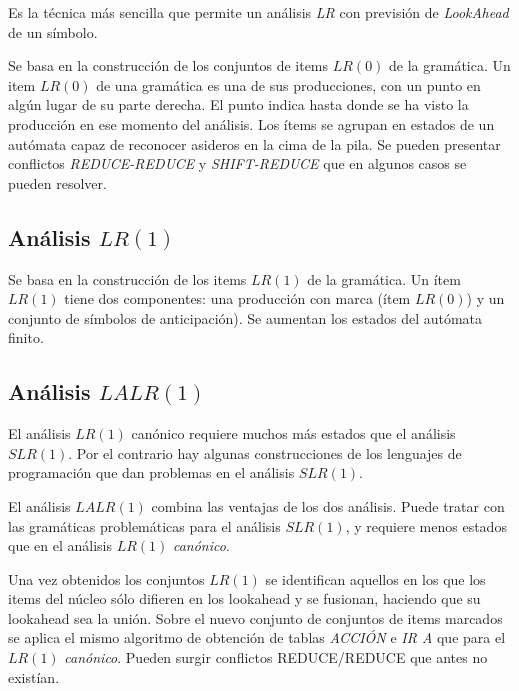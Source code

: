 Es la técnica más sencilla que permite un análisis \textit{LR} con previsión de \textit{LookAhead} de un símbolo.

Se basa en la construcción de los conjuntos de items $LR(0)$ de la gramática. Un item $LR(0)$ de una gramática es una de sus producciones, con un punto en algún lugar de su parte derecha. El punto indica hasta donde se ha visto la producción en ese momento del análisis. 
Los ítems se agrupan en estados de un autómata capaz de reconocer asideros en la cima de la pila.
Se pueden presentar conflictos \textit{REDUCE-REDUCE}  y \textit{SHIFT-REDUCE} que en algunos casos se pueden resolver. 


\subsection{Análisis $LR(1)$}

Se basa en la  construcción de los items $LR(1)$ de la gramática. Un ítem $LR(1)$ tiene dos componentes: una producción con marca (ítem $LR(0)$) y un conjunto de símbolos de anticipación).  Se aumentan los estados del autómata finito.





\subsection{Análisis $LALR(1)$}

El análisis $LR(1)$ canónico requiere muchos más estados que el análisis $SLR(1)$. Por el contrario hay algunas construcciones de los lenguajes de programación que dan problemas en el análisis $SLR(1)$.

El análisis $LALR(1)$ combina las ventajas de los dos análisis. Puede tratar con las gramáticas problemáticas para el análisis $SLR(1)$, y requiere menos estados que en el análisis $LR(1)$ \textit{canónico}.

Una vez obtenidos los conjuntos $LR(1)$ se identifican aquellos en los que los items del núcleo sólo difieren en los lookahead y se fusionan, haciendo que su lookahead sea la unión.
Sobre el nuevo conjunto de conjuntos de items marcados se aplica el mismo algoritmo de obtención de tablas \textit{ACCIÓN} e \textit{IR A} que para el $LR(1)$ \textit{canónico}.
Pueden surgir conflictos REDUCE/REDUCE que antes no existían. 

